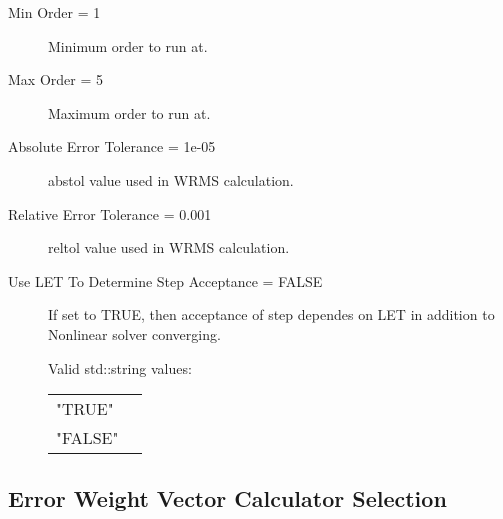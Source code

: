 \begin{list}{}
\begin{description}
      \item[Min Order = 1] 
Minimum order to run at.
      \item[Max Order = 5] 
Maximum order to run at.
      \item[Absolute Error Tolerance = 1e-05] 
abstol value used in WRMS calculation.
      \item[Relative Error Tolerance = 0.001] 
reltol value used in WRMS calculation.
      \item[Use LET To Determine Step Acceptance = FALSE] 
If set to TRUE, then acceptance of step dependes on LET in addition to Nonlinear solver converging.

  Valid std::string values:

      \begin{tabular}{lp{}}
      "TRUE" & \\ 
      "FALSE" & \\ 
      \end{tabular}
\end{description}

\end{list}

\subsection{Error Weight Vector Calculator Selection}
\label{sec:Error Weight Vector Calculator Selection}

